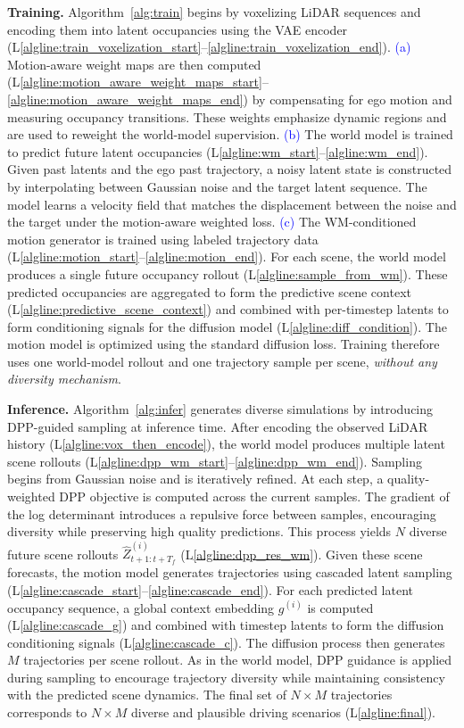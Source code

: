 \documentclass[runningheads]{llncs}
\begin{document}
\textbf{Training.} Algorithm~\ref{alg:train} begins by voxelizing LiDAR sequences and encoding them into latent occupancies using the VAE encoder  (L\ref{algline:train_voxelization_start}--\ref{algline:train_voxelization_end}). \textcolor{blue}{(a)} Motion-aware weight maps are then computed (L\ref{algline:motion_aware_weight_maps_start}--\ref{algline:motion_aware_weight_maps_end})
by compensating for ego motion and measuring occupancy transitions. These weights emphasize dynamic regions and are used to reweight the world-model supervision. \textcolor{blue}{(b)} The world model is trained to predict future latent occupancies (L\ref{algline:wm_start}--\ref{algline:wm_end}). Given past latents and the ego past trajectory, a noisy latent state is constructed by interpolating between Gaussian noise and the target latent sequence. The model learns a velocity field that matches the displacement between the noise and the target under the motion-aware weighted loss. \textcolor{blue}{(c)} The WM-conditioned motion generator is trained using labeled trajectory data (L\ref{algline:motion_start}--\ref{algline:motion_end}). For each scene, the world model produces a single future occupancy rollout (L\ref{algline:sample_from_wm}). These predicted occupancies are aggregated to form the predictive scene context (L\ref{algline:predictive_scene_context}) and combined with per-timestep latents to form conditioning signals for the diffusion model (L\ref{algline:diff_condition}). The motion model is optimized using the standard diffusion loss. Training therefore uses one world-model rollout and one trajectory sample per scene, \textit{without any diversity mechanism}.

\vspace{1mm}
\textbf{Inference.} Algorithm~\ref{alg:infer} generates diverse simulations by introducing DPP-guided sampling at inference time. After encoding the observed LiDAR history (L\ref{algline:vox_then_encode}), the world model produces multiple latent scene rollouts (L\ref{algline:dpp_wm_start}--\ref{algline:dpp_wm_end}). Sampling begins from Gaussian noise and is iteratively refined. At each step, a quality-weighted DPP objective is computed across the current samples. The gradient of the log determinant introduces a repulsive force between samples, encouraging diversity while preserving high quality predictions. This process yields $N$ diverse future scene rollouts $\hat{Z}_{t+1: t+T_f}^{(i)}$ (L\ref{algline:dpp_res_wm}). Given these scene forecasts, the motion model generates trajectories using cascaded latent sampling (L\ref{algline:cascade_start}--\ref{algline:cascade_end}). For each predicted latent occupancy sequence, a global context embedding $g^{(i)}$ is computed (L\ref{algline:cascade_g}) and combined with timestep latents to form the diffusion conditioning signals (L\ref{algline:cascade_c}). The diffusion process then generates $M$ trajectories per scene rollout. As in the world model, DPP guidance is applied during sampling to encourage trajectory diversity while maintaining consistency with the predicted scene dynamics. The final set of $N \times M$ trajectories corresponds to $N \times M$ diverse and plausible driving scenarios (L\ref{algline:final}).
\end{document}
